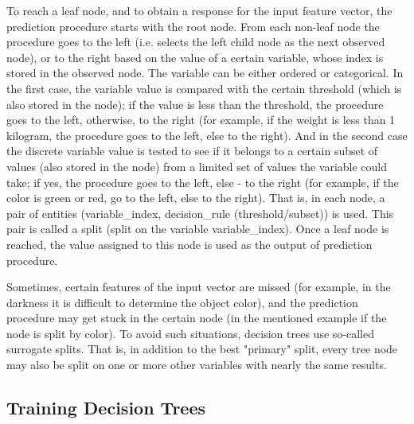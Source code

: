 To reach a leaf node, and to obtain a response for the input feature
vector, the prediction procedure starts with the root node. From each
non-leaf node the procedure goes to the left (i.e. selects the left
child node as the next observed node), or to the right based on the
value of a certain variable, whose index is stored in the observed
node. The variable can be either ordered or categorical. In the first
case, the variable value is compared with the certain threshold (which
is also stored in the node); if the value is less than the threshold,
the procedure goes to the left, otherwise, to the right (for example,
if the weight is less than 1 kilogram, the procedure goes to the left,
else to the right). And in the second case the discrete variable value is
tested to see if it belongs to a certain subset of values (also stored
in the node) from a limited set of values the variable could take; if
yes, the procedure goes to the left, else - to the right (for example,
if the color is green or red, go to the left, else to the right). That
is, in each node, a pair of entities (variable\_index, decision\_rule
(threshold/subset)) is used. This pair is called a split (split on
the variable variable\_index). Once a leaf node is reached, the value
assigned to this node is used as the output of prediction procedure.

Sometimes, certain features of the input vector are missed (for example, in the darkness it is difficult to determine the object color), and the prediction procedure may get stuck in the certain node (in the mentioned example if the node is split by color). To avoid such situations, decision trees use so-called surrogate splits. That is, in addition to the best "primary" split, every tree node may also be split on one or more other variables with nearly the same results.

\subsection{Training Decision Trees}

